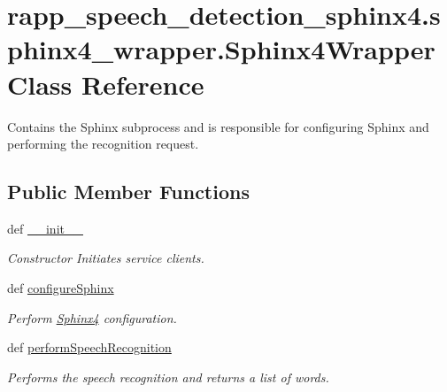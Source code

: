 \hypertarget{classrapp__speech__detection__sphinx4_1_1sphinx4__wrapper_1_1Sphinx4Wrapper}{\section{rapp\-\_\-speech\-\_\-detection\-\_\-sphinx4.\-sphinx4\-\_\-wrapper.\-Sphinx4\-Wrapper Class Reference}
\label{classrapp__speech__detection__sphinx4_1_1sphinx4__wrapper_1_1Sphinx4Wrapper}
}


Contains the Sphinx subprocess and is responsible for configuring Sphinx and performing the recognition request.  


\subsection*{Public Member Functions}
\begin{DoxyCompactItemize}
\item 
def \hyperlink{classrapp__speech__detection__sphinx4_1_1sphinx4__wrapper_1_1Sphinx4Wrapper_a540295a971600831c3b36968c32ad842}{\-\_\-\-\_\-init\-\_\-\-\_\-}
\begin{DoxyCompactList}\small\item\em Constructor Initiates service clients. \end{DoxyCompactList}\item 
def \hyperlink{classrapp__speech__detection__sphinx4_1_1sphinx4__wrapper_1_1Sphinx4Wrapper_a0629ff048d1714cc7fe581a39375afc5}{configure\-Sphinx}
\begin{DoxyCompactList}\small\item\em Perform \hyperlink{classSphinx4}{Sphinx4} configuration. \end{DoxyCompactList}\item 
def \hyperlink{classrapp__speech__detection__sphinx4_1_1sphinx4__wrapper_1_1Sphinx4Wrapper_af43486249bab4de044fdccb7d43e8966}{perform\-Speech\-Recognition}
\begin{DoxyCompactList}\small\item\em Performs the speech recognition and returns a list of words. \end{DoxyCompactList}\end{DoxyCompactItemize}
